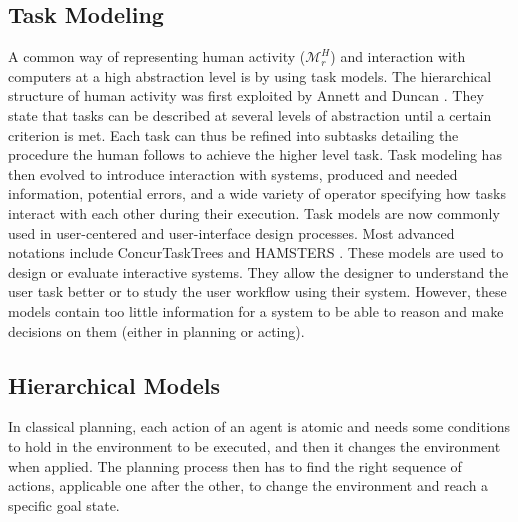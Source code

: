 \subsection{Task Modeling}

A common way of representing human activity ($\mathcal{M}^H_r$) and interaction with computers at a high abstraction level is by using task models. The hierarchical structure of human activity was first exploited by Annett and Duncan \cite{annett1967task}. They state that tasks can be described at several levels of abstraction until a certain criterion is met. Each task can thus be refined into subtasks detailing the procedure the human follows to achieve the higher level task. Task modeling has then evolved to introduce interaction with systems, produced and needed information, potential errors, and a wide variety of operator specifying how tasks interact with each other during their execution. Task models are now commonly used in user-centered and user-interface design processes. Most advanced notations include ConcurTaskTrees \cite{paterno2004concurtasktrees} and HAMSTERS \cite{martinie2019analysing}. These models are used to design or evaluate interactive systems. They allow the designer to understand the user task better or to study the user workflow using their system. However, these models contain too little information for a system to be able to reason and make decisions on them (either in planning or acting).


\subsection{Hierarchical Models}

In classical planning, each action of an agent is atomic and needs some conditions to hold in the environment to be executed, and then it changes the environment when applied. The planning process then has to find the right sequence of actions, applicable one after the other, to change the environment and reach a specific goal state. 

